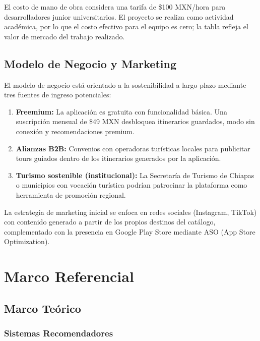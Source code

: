 \documentclass[12pt,letterpaper]{report}
\begin{document}
El costo de mano de obra considera una tarifa de \$100 MXN/hora para desarrolladores junior
universitarios. El proyecto se realiza como actividad académica, por lo que el costo efectivo
para el equipo es cero; la tabla refleja el valor de mercado del trabajo realizado.

\section{Modelo de Negocio y Marketing}

El modelo de negocio está orientado a la sostenibilidad a largo plazo mediante tres fuentes de
ingreso potenciales:

\begin{enumerate}[leftmargin=2cm]
  \item \textbf{Freemium:} La aplicación es gratuita con funcionalidad básica. Una suscripción
        mensual de \$49 MXN desbloquea itinerarios guardados, modo sin conexión y recomendaciones
        premium.
  \item \textbf{Alianzas B2B:} Convenios con operadoras turísticas locales para publicitar tours
        guiados dentro de los itinerarios generados por la aplicación.
  \item \textbf{Turismo sostenible (institucional):} La Secretaría de Turismo de Chiapas o
        municipios con vocación turística podrían patrocinar la plataforma como herramienta de
        promoción regional.
\end{enumerate}

La estrategia de marketing inicial se enfoca en redes sociales (Instagram, TikTok) con
contenido generado a partir de los propios destinos del catálogo, complementado con la
presencia en Google Play Store mediante ASO (App Store Optimization).

\chapter{Marco Referencial}

\section{Marco Teórico}

\subsection{Sistemas Recomendadores}
\end{document}
